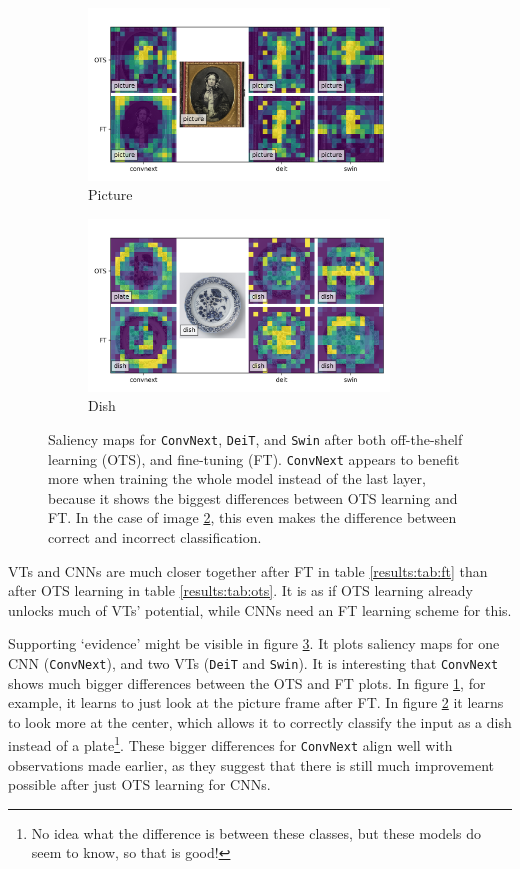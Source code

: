 \begin{figure}[tb]
    \centering
    \begin{subfigure}{0.49\textwidth}
    \includegraphics[width=8cm]{img/img011_salience.png}
    \caption{Picture}
    \label{results:img:sal:picture}
    \end{subfigure}
    \begin{subfigure}{0.49\textwidth}
    \includegraphics[width=8cm]{img/img005_salience.png}
    \caption{Dish}
    \label{results:img:sal:dish}
    \end{subfigure}
    \caption{Saliency maps for \texttt{ConvNext}, \texttt{DeiT}, and \texttt{Swin} after both off-the-shelf learning (OTS), and fine-tuning (FT). \texttt{ConvNext} appears to benefit more when training the whole model instead of the last layer, because it shows the biggest differences between OTS learning and FT. In the case of image \ref{results:img:sal:dish}, this even makes the difference between correct and incorrect classification.}
    \label{results:img:sal}
\end{figure}

VTs and CNNs are much closer together after FT in table \ref{results:tab:ft} than after OTS learning in table \ref{results:tab:ots}. It is as if OTS learning already unlocks much of VTs' potential, while CNNs need an FT learning scheme for this.

Supporting `evidence' might be visible in figure \ref{results:img:sal}. It plots saliency maps for one CNN (\texttt{ConvNext}), and two VTs (\texttt{DeiT} and \texttt{Swin}). It is interesting that \texttt{ConvNext} shows much bigger differences between the OTS and FT plots. In figure \ref{results:img:sal:picture}, for example, it learns to just look at the picture frame after FT. In figure \ref{results:img:sal:dish} it learns to look more at the center, which allows it to correctly classify the input as a dish instead of a plate\footnote{No idea what the difference is between these classes, but these models do seem to know, so that is good!}. %
These bigger differences for \texttt{ConvNext} align well with observations made earlier, as they suggest that there is still much improvement possible after just OTS learning for CNNs.


